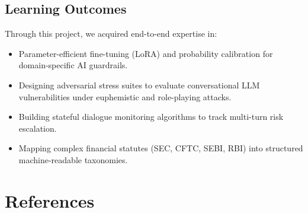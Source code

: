 \documentclass[11pt,a4paper]{article}
\begin{document}
\subsection{Learning Outcomes}
Through this project, we acquired end-to-end expertise in:
\begin{itemize}[noitemsep]
    \item Parameter-efficient fine-tuning (LoRA) and probability calibration for domain-specific AI guardrails.
    \item Designing adversarial stress suites to evaluate conversational LLM vulnerabilities under euphemistic and role-playing attacks.
    \item Building stateful dialogue monitoring algorithms to track multi-turn risk escalation.
    \item Mapping complex financial statutes (SEC, CFTC, SEBI, RBI) into structured machine-readable taxonomies.
\end{itemize}

\section{References}
\end{document}
